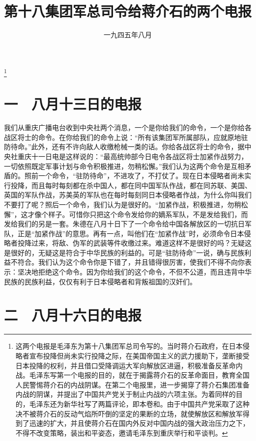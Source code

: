 
\title{第十八集团军总司令给蒋介石的两个电报}
\date{一九四五年八月}
\thanks{这两个电报是毛泽东为第十八集团军总司令写的。当时蒋介石政府，在日本侵略者宣布投降但尚未实行投降之际，在美国帝国主义的武力援助下，垄断接受日本投降的权利，并且借口受降调运大军向解放区进逼，积极准备反革命内战。毛泽东写第一个电报的目的，就在于揭露蒋介石的反革命面目，教育全国人民警惕蒋介石的内战阴谋。在第二个电报里，进一步揭穿了蒋介石集团准备内战的阴谋，并提出了中国共产党关于制止内战的六项主张。为着同样的目的，毛泽东还为新华社写了两篇评论，即本卷和。由于中国共产党采取了这种决不被蒋介石的反动气焰所吓倒的坚定的果断的立场，就使解放区和解放军得到了迅速的扩大，并且使蒋介石在国内外反对中国内战的强大政治压力之下，不得不改变策略，装出和平姿态，邀请毛泽东到重庆举行和平谈判。}
\maketitle


\section{一　八月十三日的电报}

我们从重庆广播电台收到中央社两个消息，一个是你给我们的命令，一个是你给各战区将士的命令。在你给我们的命令上说：“所有该集团军所属部队，应就原地驻防待命。”此外，还有不许向敌人收缴枪械一类的话。你给各战区将士的命令，据中央社重庆十一日电是这样说的：“最高统帅部今日电令各战区将士加紧作战努力，一切依照既定军事计划与命令积极推进，勿稍松懈。”我们认为这两个命令是互相矛盾的。照前一个命令，“驻防待命”，不进攻了，不打仗了。现在日本侵略者尚未实行投降，而且每时每刻都在杀中国人，都在同中国军队作战，都在同苏联、美国、英国的军队作战，苏美英的军队也在每时每刻同日本侵略者作战，为什么你叫我们不要打了呢？照后一个命令，我们认为是很好的。“加紧作战，积极推进，勿稍松懈”，这才像个样子。可惜你只把这个命令发给你的嫡系军队，不是发给我们，而发给我们的另是一套。朱德在八月十日下了一个命令给中国各解放区的一切抗日军队，正是“加紧作战”的意思。再有一点，叫他们在“加紧作战”时，必须命令日本侵略者投降过来，将敌、伪军的武装等件收缴过来。难道这样不是很好的吗？无疑这是很好的，无疑这是符合于中华民族的利益的。可是“驻防待命”一说，确与民族利益不符合。我们认为这个命令你是下错了，并且错得很厉害，使我们不得不向你表示：坚决地拒绝这个命令。因为你给我们的这个命令，不但不公道，而且违背中华民族的民族利益，仅仅有利于日本侵略者和背叛祖国的汉奸们。

\section{二　八月十六日的电报}

